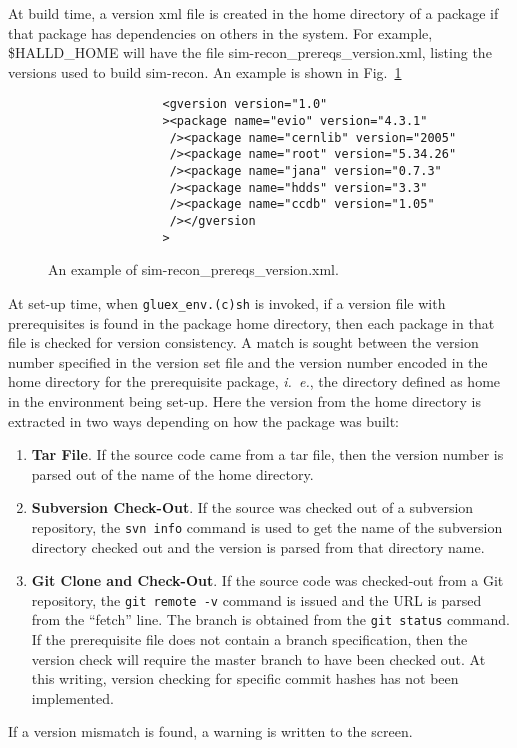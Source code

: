 \documentclass[12pt]{article}
\begin{document}
At build time, a version xml file is created in the home directory of
a package if that package has dependencies on others in the
system. For example, \$HALLD\_HOME will have the file
sim-recon\_prereqs\_version.xml, listing the versions used to build
sim-recon. An example is shown in Fig.~\ref{figure:prereqs-xml-file}

\begin{figure}
\begin{verbatim}
                <gversion version="1.0"
                ><package name="evio" version="4.3.1"
                 /><package name="cernlib" version="2005"
                 /><package name="root" version="5.34.26"
                 /><package name="jana" version="0.7.3"
                 /><package name="hdds" version="3.3"
                 /><package name="ccdb" version="1.05"
                 /></gversion
                >
\end{verbatim}
\caption{An example of sim-recon\_prereqs\_version.xml.}\label{figure:prereqs-xml-file}
\end{figure}

At set-up time, when {\tt gluex\_env.(c)sh} is invoked, if a version
file with prerequisites is found in the package home directory, then
each package in that file is checked for version consistency. A match
is sought between the version number specified in the version set file and
the version number encoded in the home directory for the prerequisite
package, {\it i.~e.}, the directory defined as home in the environment
being set-up. Here the version from the home directory is extracted in
two ways depending on how the package was built:
\begin{enumerate}

\item {\bf Tar File}. If the source code came from a tar file, then
  the version number is parsed out of the name of the home directory.

\item {\bf Subversion Check-Out}. If the source was checked out of a
  subversion repository, the {\tt svn info} command is used to get the
  name of the subversion directory checked out and the version is
  parsed from that directory name.

\item {\bf Git Clone and Check-Out}. If the source code was
  checked-out from a Git repository, the {\tt git remote -v} command
  is issued and the URL is parsed from the ``fetch'' line. The branch
  is obtained from the {\tt git status} command. If the prerequisite
  file does not contain a branch specification, then the version check
  will require the master branch to have been checked out. At this
  writing, version checking for specific commit hashes has not been
  implemented.

\end{enumerate}
If a version mismatch is found, a warning is written to the screen.
\end{document}
